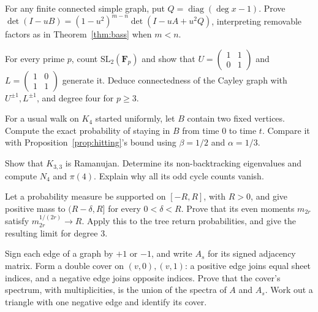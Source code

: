 \begin{exercise}[$\star\star$]\label{ex:irregularbass}
For any finite connected simple graph, put $Q=\operatorname{diag}(\deg x-1)$. Prove
$\det(I-uB)=(1-u^2)^{m-n}\det(I-uA+u^2Q)$,
interpreting removable factors as in Theorem~\ref{thm:bass} when $m<n$.
\end{exercise}
\begin{exercise}[$\star\star$]\label{ex:sl2gen}
For every prime $p$, count $\mathrm{SL}_2(\mathbf F_p)$ and show that $U=\begin{pmatrix}1&1\\0&1\end{pmatrix}$ and $L=\begin{pmatrix}1&0\\1&1\end{pmatrix}$ generate it. Deduce connectedness of the Cayley graph with $U^{\pm1},L^{\pm1}$, and degree four for $p\ge3$.
\end{exercise}

\begin{exercise}[$\star\star$]\label{ex:v8c07a}
For a usual walk on $K_4$ started uniformly, let $B$ contain two fixed vertices. Compute the exact probability of staying in $B$ from time $0$ to time $t$. Compare it with Proposition~\ref{prop:hitting}'s bound using $\beta=1/2$ and $\alpha=1/3$.
\end{exercise}
\begin{exercise}[$\star\star$]\label{ex:v8c07b}
Show that $K_{3,3}$ is Ramanujan. Determine its non-backtracking eigenvalues and compute $N_4$ and $\pi(4)$. Explain why all its odd cycle counts vanish.
\end{exercise}
\begin{exercise}[$\star\star$]\label{ex:v8c07c}
Let a probability measure be supported on $[-R,R]$, with $R>0$, and give positive mass to $(R-\delta,R]$ for every $0<\delta<R$. Prove that its even moments $m_{2r}$ satisfy $m_{2r}^{1/(2r)}\to R$. Apply this to the tree return probabilities, and give the resulting limit for degree $3$.
\end{exercise}
\begin{exercise}[$\star\star$]\label{ex:v8c07d}
Sign each edge of a graph by $+1$ or $-1$, and write $A_s$ for its signed adjacency matrix. Form a double cover on $(v,0),(v,1)$: a positive edge joins equal sheet indices, and a negative edge joins opposite indices. Prove that the cover's spectrum, with multiplicities, is the union of the spectra of $A$ and $A_s$. Work out a triangle with one negative edge and identify its cover.
\end{exercise}

